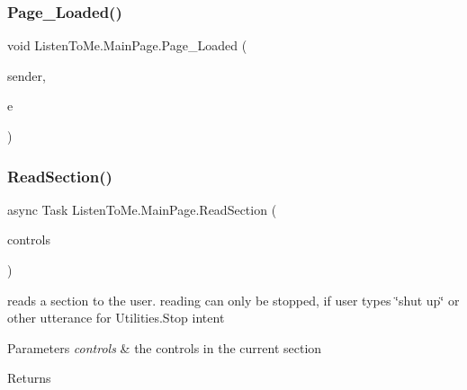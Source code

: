\subsubsection{\texorpdfstring{Page\+\_\+\+Loaded()}{Page\_Loaded()}}
{\footnotesize\ttfamily void Listen\+To\+Me.\+Main\+Page.\+Page\+\_\+\+Loaded (\begin{DoxyParamCaption}\item[{object}]{sender,  }\item[{Routed\+Event\+Args}]{e }\end{DoxyParamCaption})\hspace{0.3cm}{\ttfamily [private]}}

\mbox{\label{class_listen_to_me_1_1_main_page_ac18d07a7cf5452ea9fc8539764cc026d}} 
\subsubsection{\texorpdfstring{Read\+Section()}{ReadSection()}}
{\footnotesize\ttfamily async Task Listen\+To\+Me.\+Main\+Page.\+Read\+Section (\begin{DoxyParamCaption}\item[{I\+Queryable$<$ U\+I\+Element $>$}]{controls }\end{DoxyParamCaption})\hspace{0.3cm}{\ttfamily [private]}}



reads a section to the user. reading can only be stopped, if user types \char`\"{}shut up\char`\"{} or other utterance for Utilities.\+Stop intent 


\begin{DoxyParams}{Parameters}
{\em controls} & the controls in the current section\\
\hline
\end{DoxyParams}
\begin{DoxyReturn}{Returns}

\end{DoxyReturn}
\mbox{\label{class_listen_to_me_1_1_main_page_a09c2518852d4261ff6a2118c8e01de9f}} 
